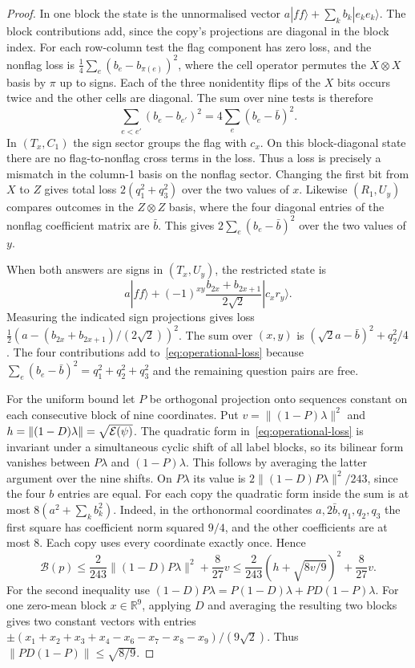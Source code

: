 \begin{proof}
In one block the state is the unnormalised vector $a|ff\rangle+\sum_k b_k|e_ke_k\rangle$. The block contributions add, since the copy's projections are diagonal in the block index. For each row-column test the flag component has zero loss, and the nonflag loss is $\tfrac14\sum_e(b_e-b_{\pi(e)})^2$, where the cell operator permutes the $X\otimes X$ basis by $\pi$ up to signs. Each of the three nonidentity flips of the $X$ bits occurs twice and the other cells are diagonal. The sum over nine tests is therefore
\[
 \sum_{e<e'}(b_e-b_{e'})^2=4\sum_e(b_e-\bar b)^2.
\]
In $(T_x,C_1)$ the sign sector groups the flag with $c_x$. On this block-diagonal state there are no flag-to-nonflag cross terms in the loss. Thus a loss is precisely a mismatch in the column-1 basis on the nonflag sector. Changing the first bit from $X$ to $Z$ gives total loss $2(q_1^2+q_3^2)$ over the two values of $x$. Likewise $(R_1,U_y)$ compares outcomes in the $Z\otimes Z$ basis, where the four diagonal entries of the nonflag coefficient matrix are $\bar b$. This gives $2\sum_e(b_e-\bar b)^2$ over the two values of $y$.

When both answers are signs in $(T_x,U_y)$, the restricted state is
\[
 a|ff\rangle+(-1)^{xy}\frac{b_{2x}+b_{2x+1}}{2\sqrt2}|c_xr_y\rangle.
\]
Measuring the indicated sign projections gives loss $\tfrac12(a-(b_{2x}+b_{2x+1})/(2\sqrt2))^2$. The sum over $(x,y)$ is $(\sqrt2a-\bar b)^2+q_2^2/4$. The four contributions add to~\eqref{eq:operational-loss} because $\sum_e(b_e-\bar b)^2=q_1^2+q_2^2+q_3^2$ and the remaining question pairs are free.

For the uniform bound let $P$ be orthogonal projection onto sequences constant on each consecutive block of nine coordinates. Put $v=\|(1-P)\lambda\|^2$ and $h=\|(1-D)\lambda\|=\sqrt{\mathcal{E}(\psi)}$. The quadratic form in~\eqref{eq:operational-loss} is invariant under a simultaneous cyclic shift of all label blocks, so its bilinear form vanishes between $P\lambda$ and $(1-P)\lambda$. This follows by averaging the latter argument over the nine shifts. On $P\lambda$ its value is $2\|(1-D)P\lambda\|^2/243$, since the four $b$ entries are equal. For each copy the quadratic form inside the sum is at most $8(a^2+\sum_k b_k^2)$. Indeed, in the orthonormal coordinates $a,2\bar b,q_1,q_2,q_3$ the first square has coefficient norm squared $9/4$, and the other coefficients are at most $8$. Each copy uses every coordinate exactly once. Hence
\begin{equation}\label{eq:operational-adaptive}
 \mathcal B(p)\le \frac2{243}\|(1-D)P\lambda\|^2+\frac8{27}v
 \le \frac2{243}(h+\sqrt{8v/9})^2+\frac8{27}v.
\end{equation}
For the second inequality use $(1-D)P\lambda=P(1-D)\lambda+PD(1-P)\lambda$. For one zero-mean block $x\in\mathbb R^9$, applying $D$ and averaging the resulting two blocks gives two constant vectors with entries $\pm (x_1+x_2+x_3+x_4-x_6-x_7-x_8-x_9)/(9\sqrt2)$. Thus $\|PD(1-P)\|\le\sqrt{8/9}$.


\end{proof}
